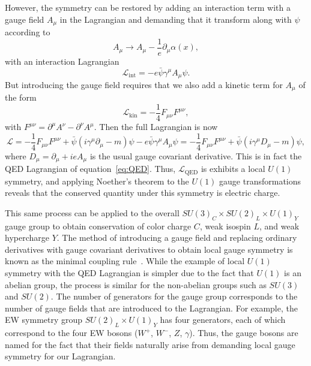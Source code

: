 However, the symmetry can be restored by adding an interaction term with a gauge field $A_\mu$ in the Lagrangian and demanding that it transform along with $\psi$ according to
\begin{equation}
  A_\mu\to A_\mu-\frac{1}{e}\partial_\mu\alpha(x),
\end{equation}
with an interaction Lagrangian
\begin{equation}
  \mathcal{L}_\mathrm{int}=-e\bar{\psi}\gamma^\mu A_\mu\psi.
\end{equation}
But introducing the gauge field requires that we also add a kinetic term for $A_\mu$ of the form
\begin{equation}
  \mathcal{L}_\mathrm{kin}=-\frac{1}{4}F_{\mu\nu}F^{\mu\nu},
\end{equation}
with $F^{\mu\nu}=\partial^\mu A^\nu-\partial^\nu A^\mu$.
Then the full Lagrangian is now
\begin{equation}
  \mathcal{L}=-\frac{1}{4}F_{\mu\nu}F^{\mu\nu}+\bar{\psi}(i\gamma^\mu\partial_\mu-m)\psi-e\bar{\psi}\gamma^\mu A_\mu\psi=-\frac{1}{4}F_{\mu\nu}F^{\mu\nu}+\bar{\psi}(i\gamma^\mu D_\mu-m)\psi,
\end{equation}
where $D_\mu=\partial_\mu+ieA_\mu$ is the usual gauge covariant derivative.
This is in fact the QED Lagrangian of equation~\ref{eq:QED}.
Thus, $\mathcal{L}_\mathrm{QED}$ is exhibits a local $U(1)$ symmetry, and applying Noether's theorem to the $U(1)$ gauge transformations reveals that the conserved quantity under this symmetry is electric charge.

This same process can be applied to the overall $SU(3)_C\times SU(2)_L\times U(1)_Y$ gauge group to obtain conservation of color charge $C$, weak isospin $L$, and weak hypercharge $Y$.
The method of introducing a gauge field and replacing ordinary derivatives with gauge covariant derivatives to obtain local gauge symmetry is known as the minimal coupling rule~\cite{cheng1984}.
While the example of local $U(1)$ symmetry with the QED Lagrangian is simpler due to the fact that $U(1)$ is an abelian group, the process is similar for the non-abelian groups such as $SU(3)$ and $SU(2)$.
The number of generators for the gauge group corresponds to the number of gauge fields that are introduced to the Lagrangian.
For example, the EW symmetry group $SU(2)_L\times U(1)_Y$ has four generators, each of which correspond to the four EW bosons ($W^+$, $W^-$, $Z$, $\gamma$).
Thus, the gauge bosons are named for the fact that their fields naturally arise from demanding local gauge symmetry for our Lagrangian.

